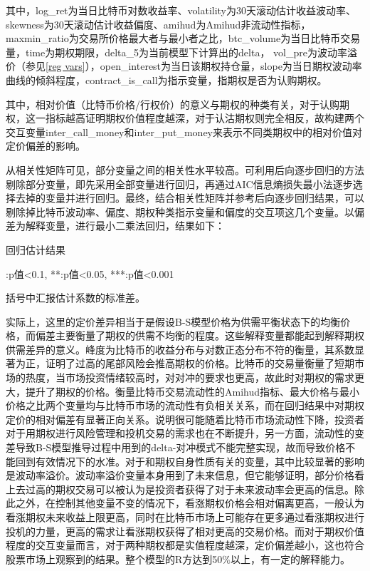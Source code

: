    \newpage
\restoregeometry
其中，log\_ret为当日比特币对数收益率、volatility为30天滚动估计收益波动率、skewness为30天滚动估计收益偏度、amihud为Amihud非流动性指标，maxmin\_ratio为交易所价格最大者与最小者之比，btc\_volume为当日比特币交易量，time为期权期限，delta\_5为当前模型下计算出的delta，
vol\_pre为波动率溢价（参见\ref{reg vars}），open\_interest为当日该期权持仓量，slope为当日期权波动率曲线的倾斜程度，contract\_is\_call为指示变量，指期权是否为认购期权。
\par{其中，相对价值（比特币价格/行权价）的意义与期权的种类有关，对于认购期权，这一指标越高证明期权价值程度越深，对于认沽期权则完全相反，故构建两个交互变量inter\_call\_money和inter\_put\_money来表示不同类期权中的相对价值对定价偏差的影响。}
\par{从相关性矩阵可见，部分变量之间的相关性水平较高。可利用后向逐步回归的方法剔除部分变量，即先采用全部变量进行回归，再通过AIC信息熵损失最小法逐步选择去掉的变量并进行回归。最终，结合相关性矩阵并参考后向逐步回归结果，可以剔除掉比特币波动率、偏度、期权种类指示变量和偏度的交互项这几个变量。以偏差为解释变量，进行最小二乘法回归，结果如下：}
\newpage
{}
\begin{center}
    \begin{threeparttable}[H]

        \caption{回归估计结果}
        
        
        \begin{tablenotes}
            \footnotesize
            \item *:p值<0.1, **:p值<0.05, ***:p值<0.001
            \item 括号中汇报估计系数的标准差。
        \end{tablenotes}
    \end{threeparttable}
\end{center}
\newpage
\restoregeometry
\par{
实际上，这里的定价差异相当于是假设B-S模型价格为供需平衡状态下的均衡价格，而偏差主要衡量了期权的供需不均衡的程度。这些解释变量都能起到解释期权供需差异的意义。峰度为比特币的收益分布与对数正态分布不符的衡量，其系数显著为正，证明了过高的尾部风险会推高期权的价格。比特币的交易量衡量了短期市场的热度，当市场投资情绪较高时，对对冲的要求也更高，故此时对期权的需求更大，提升了期权的价格。衡量比特币交易流动性的Amihud指标、最大价格与最小价格之比两个变量均与比特币市场的流动性有负相关关系，而在回归结果中对期权定价的相对偏差有显著正向关系。说明很可能随着比特币市场流动性下降，投资者对于用期权进行风险管理和投机交易的需求也在不断提升，另一方面，流动性的变差导致B-S模型推导过程中用到的delta-对冲模式不能完整实现，故而导致价格不能回到有效情况下的水准。对于和期权自身性质有关的变量，其中比较显著的影响是波动率溢价。波动率溢价变量本身用到了未来信息，但它能够证明，部分价格看上去过高的期权交易可以被认为是投资者获得了对于未来波动率会更高的信息。除此之外，在控制其他变量不变的情况下，看涨期权价格会相对偏离更高，一般认为看涨期权未来收益上限更高，同时在比特币市场上可能存在更多通过看涨期权进行投机的力量，更高的需求让看涨期权获得了相对更高的交易价格。而对于期权价值程度的交互变量而言，对于两种期权都是实值程度越深，定价偏差越小，这也符合股票市场上观察到的结果。整个模型的R方达到50$\%$以上，有一定的解释能力。
}
